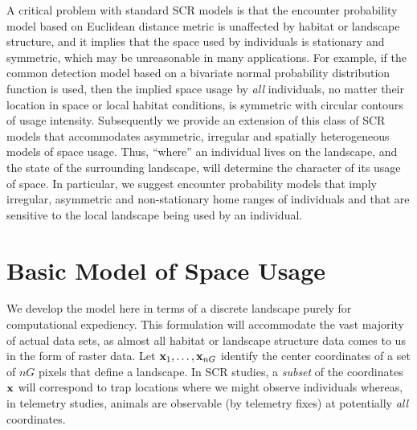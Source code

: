 \documentclass[12pt]{article}
\begin{document}
A critical problem with standard SCR models is that the encounter
probability model based on Euclidean distance metric is unaffected by
habitat or landscape structure, and it implies that the space used by
individuals is stationary and symmetric, which may be unreasonable in
many applications.  For example, if the common detection model based
on a bivariate normal probability distribution function is used, then
the implied space usage by {\it all} individuals, no matter their
location in space or local habitat conditions, is symmetric with
circular contours of usage intensity.  Subsequently we provide an
extension of this class of SCR models that accommodates asymmetric,
irregular and spatially heterogeneous models of space usage.  Thus,
``where'' an individual lives on the landscape, and the state of the
surrounding landscape, will determine the character of its usage of
space. In particular, we suggest encounter probability models that
imply irregular, asymmetric and non-stationary home ranges of
individuals and that are sensitive to the local landscape being used
by an individual.

\section{Basic Model of Space Usage}
\label{rsf.sec.rsfmodel}

We develop the model here in terms of a discrete landscape purely for
computational expediency. This formulation will accommodate the vast
majority of actual data sets, as almost all habitat or landscape
structure data comes to us in the form of raster data.  Let ${\bf
  x}_{1},\ldots,{\bf x}_{nG}$ identify the center coordinates of a set
of $nG$ pixels that define a landscape.  In SCR studies, a {\it
  subset} of the coordinates ${\bf x}$ will correspond to trap
locations where we might observe individuals whereas, in telemetry
studies, animals are observable (by telemetry fixes) at potentially
{\it all} coordinates.
\end{document}
